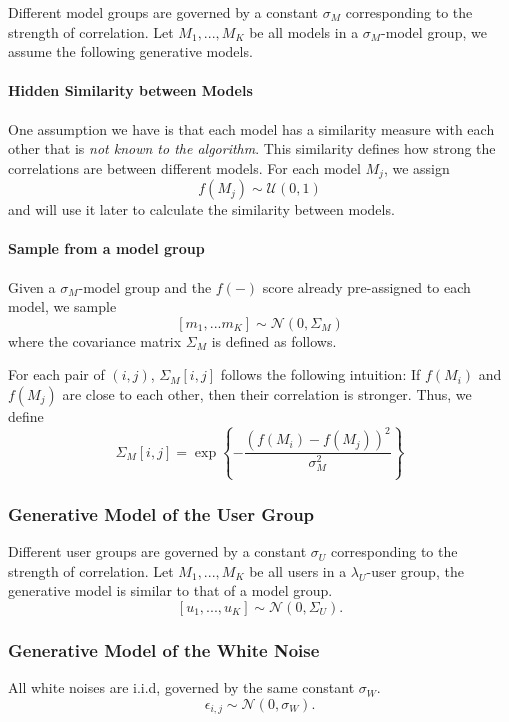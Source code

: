 \documentclass[letterpaper]{vldb}
\begin{document}
Different model groups are governed by a constant $\sigma_M$ corresponding to
the strength of correlation. Let ${M_1,...,M_K}$ be all models in a
$\sigma_M$-model group, we assume the following generative models.

\paragraph*{Hidden Similarity between Models}

One assumption we have is that each model has a similarity measure with each
other that is {\em not known to the algorithm}. This similarity defines how strong
the correlations are between different models. For each 
model $M_j$, we assign 
\[
f(M_j) \sim \mathcal{\mathcal{U}}(0, 1)
\]
and will use it later to calculate the similarity between models.

\paragraph*{Sample from a model group}

Given a $\sigma_M$-model group and the $f(-)$ score already pre-assigned to each
model, we sample 
\[
[m_1,...m_K] \sim \mathcal{N}(0, \Sigma_M)
\]
where the covariance matrix $\Sigma_M$ is defined as follows.

For each pair of $(i,j)$, $\Sigma_M[i,j]$ follows the following intuition:
If $f(M_i)$ and $f(M_j)$ are close to each other, then their correlation
is stronger. Thus, we define
\[
\Sigma_M[i,j] = \exp \left\{-\frac{(f(M_i) - f(M_j))^2}{\sigma_M^2} \right\}
\]

\subsubsection{Generative Model of the User Group}

Different user groups are governed by a constant $\sigma_U$ corresponding to
the strength of correlation. Let ${M_1,...,M_K}$ be all users in a
$\lambda_U$-user group, the generative model is similar to that of a model group.
\[
[u_1,...,u_K] \sim \mathcal{N}(0, \Sigma_U).
\]

\subsubsection{Generative Model of the White Noise}

All white noises are i.i.d, governed by the same constant $\sigma_W$.
\[
\epsilon_{i,j} \sim \mathcal{N}(0, \sigma_W).
\]
\end{document}
